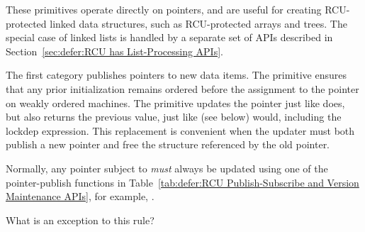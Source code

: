 These primitives operate directly on pointers, and are useful for
creating RCU-protected linked data structures, such as RCU-protected
arrays and trees.
The special case of linked lists is handled by a separate set of
APIs described in
Section~\ref{sec:defer:RCU has List-Processing APIs}.

The first category publishes pointers to new data items.
The  primitive ensures that any
prior initialization remains ordered before the assignment to the
pointer on weakly ordered machines.
The  primitive updates the pointer just like
 does, but also returns the previous value,
just like  (see below) would, including
the lockdep expression.
This replacement is convenient when the updater must both publish a new
pointer and free the structure referenced by the old pointer.

\QuickQuiz{}
	Normally, any pointer subject to  \emph{must}
	always be updated using one of the pointer-publish functions in
	Table~\ref{tab:defer:RCU Publish-Subscribe and Version Maintenance APIs},
	for example, .

	What is an exception to this rule?
 \QuickQuizEnd

